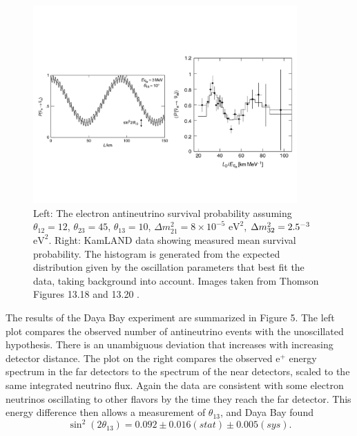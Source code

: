 \begin{figure}
  \centering
  \includegraphics[width=0.90\textwidth,height=0.90\textheight,keepaspectratio]
                {pictures/t13_18&20.pdf}
  \vspace*{-10mm}
  \caption{Left: The electron antineutrino survival probability assuming
           $\theta_{12}=12$\textdegree, $\theta_{23}=45$\textdegree,
           $\theta_{13}=10$\textdegree, $\Delta m_{21}^2=8\times10^{-5}$
           $\text{eV}^2$, $\Delta m_{32}^2=2.5\time10^{-3}$ $\text{eV}^2$.
           Right: KamLAND data showing measured mean survival probability.
           The histogram is generated from the expected distribution given
           by the oscillation parameters that best fit the data, taking
           background into account. Images taken from Thomson Figures
           13.18 and 13.20 \cite{thomson_modern_2013}.}
\end{figure}

The results of the Daya Bay experiment are summarized in Figure 5. The left
plot compares the observed number of antineutrino events with the
unoscillated hypothesis. There is an unambiguous deviation
that increases with increasing detector distance.
The plot on the right compares the observed e$^+$ energy spectrum in the far
detectors to the spectrum of the near detectors, scaled to the same integrated
neutrino flux. Again the data are consistent with some electron neutrinos
oscillating to other flavors by the time they reach the far detector.
This energy difference then allows a measurement of $\theta_{13}$, and Daya Bay
found \cite{D1}
\begin{equation}
  \sin^2(2\theta_{13})=0.092\pm0.016(stat)\pm0.005(sys).
\end{equation}

